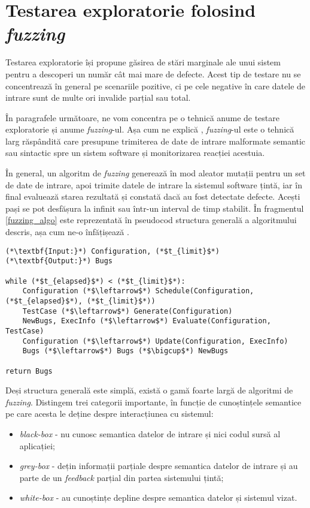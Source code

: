 \section{Testarea exploratorie folosind \emph{fuzzing}}

Testarea exploratorie își propune găsirea de stări marginale ale unui sistem pentru a descoperi un număr cât mai mare de defecte. Acest tip de testare nu se concentrează în general pe scenariile pozitive, ci pe cele negative în care datele de intrare sunt de multe ori invalide parțial sau total.

În paragrafele următoare, ne vom concentra pe o tehnică anume de testare exploratorie și anume \textit{fuzzing}-ul. Așa cum ne explică \citet{Manes2021}, \textit{fuzzing}-ul este o tehnică larg răspândită care presupune trimiterea de date de intrare malformate semantic sau sintactic spre un sistem software și monitorizarea reacției acestuia. 

În general, un algoritm de \textit{fuzzing} generează în mod aleator mutații pentru un set de date de intrare, apoi trimite datele de intrare la sistemul software țintă, iar în final evaluează starea rezultată și constată dacă au fost detectate defecte. Acești pași se pot desfășura la infinit sau într-un interval de timp stabilit. În fragmentul \ref{fuzzing_algo} este reprezentată în pseudocod structura generală a algoritmului descris, așa cum ne-o înfățișează \citet{Manes2021}.

\begin{lstlisting}[label={fuzzing_algo}, caption={Structura generală a unui algoritm de fuzzing}]
(*\textbf{Input:}*) Configuration, (*$t_{limit}$*)
(*\textbf{Output:}*) Bugs

while (*$t_{elapsed}$*) < (*$t_{limit}$*):
    Configuration (*$\leftarrow$*) Schedule(Configuration, (*$t_{elapsed}$*), (*$t_{limit}$*))
    TestCase (*$\leftarrow$*) Generate(Configuration)
    NewBugs, ExecInfo (*$\leftarrow$*) Evaluate(Configuration, TestCase)
    Configuration (*$\leftarrow$*) Update(Configuration, ExecInfo)
    Bugs (*$\leftarrow$*) Bugs (*$\bigcup$*) NewBugs
    
return Bugs
\end{lstlisting}

Deși structura generală este simplă, există o gamă foarte largă de algoritmi de \textit{fuzzing}. Distingem trei categorii importante, în funcție de cunoștințele semantice pe care acesta le deține despre interacțiunea cu sistemul:

\begin{itemize}
    \item \textit{black-box} - nu cunosc semantica datelor de intrare și nici codul sursă al aplicației;
    \item \textit{grey-box} - dețin informații parțiale despre semantica datelor de intrare și au parte de un \textit{feedback} parțial din partea sistemului țintă;
    \item \textit{white-box} - au cunoștințe depline despre semantica datelor și sistemul vizat.
\end{itemize}

